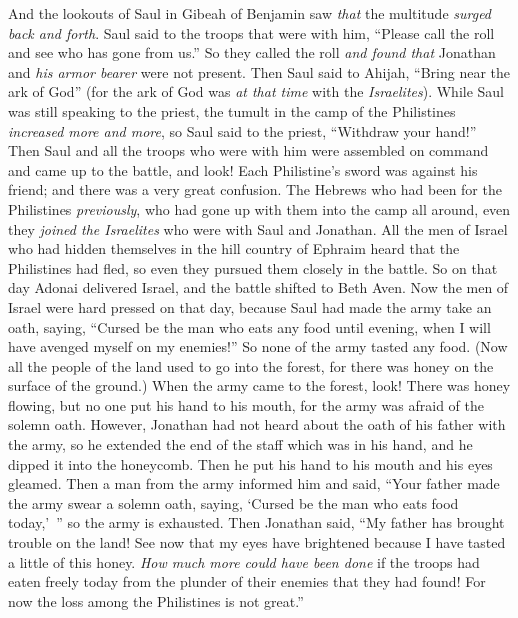 \begin{biblechapter}
\verse And the lookouts of Saul in Gibeah of Benjamin saw \textit{that} the multitude \textit{surged back and forth}.
\verse Saul said to the troops that were with him, “Please call the roll and see who has gone from us.” So they called the roll \textit{and found that} Jonathan and \textit{his armor bearer} were not present.
\verse Then Saul said to Ahijah, “Bring near the ark of God” (for the ark of God was \textit{at that time} with the \textit{Israelites}).
\verse While Saul was still speaking to the priest, the tumult in the camp of the Philistines \textit{increased more and more}, so Saul said to the priest, “Withdraw your hand!”
\verse Then Saul and all the troops who were with him were assembled on command and came up to the battle, and look! Each Philistine’s sword was against his friend; and there was a very great confusion.
\verse The Hebrews who had been for the Philistines \textit{previously}, who had gone up with them into the camp all around, even they \textit{joined the Israelites} who were with Saul and Jonathan.
\verse All the men of Israel who had hidden themselves in the hill country of Ephraim heard that the Philistines had fled, so even they pursued them closely in the battle.
\verse So on that day Adonai delivered Israel, and the battle shifted to Beth Aven.
 Now the men of Israel were hard pressed on that day, because Saul had made the army take an oath, saying, “Cursed be the man who eats any food until evening, when I will have avenged myself on my enemies!” So none of the army tasted any food.
\verse (Now all the people of the land used to go into the forest, for there was honey on the surface of the ground.)
\verse When the army came to the forest, look! There was honey flowing, but no one put his hand to his mouth, for the army was afraid of the solemn oath.
\verse However, Jonathan had not heard about the oath of his father with the army, so he extended the end of the staff which was in his hand, and he dipped it into the honeycomb. Then he put his hand to his mouth and his eyes gleamed.
\verse Then a man from the army informed him and said, “Your father made the army swear a solemn oath, saying, ‘Cursed be the man who eats food today,’ ” so the army is exhausted.
\verse Then Jonathan said, “My father has brought trouble on the land! See now that my eyes have brightened because I have tasted a little of this honey.
\verse \textit{How much more could have been done} if the troops had eaten freely today from the plunder of their enemies that they had found! For now the loss among the Philistines is not great.”

\end{biblechapter}
